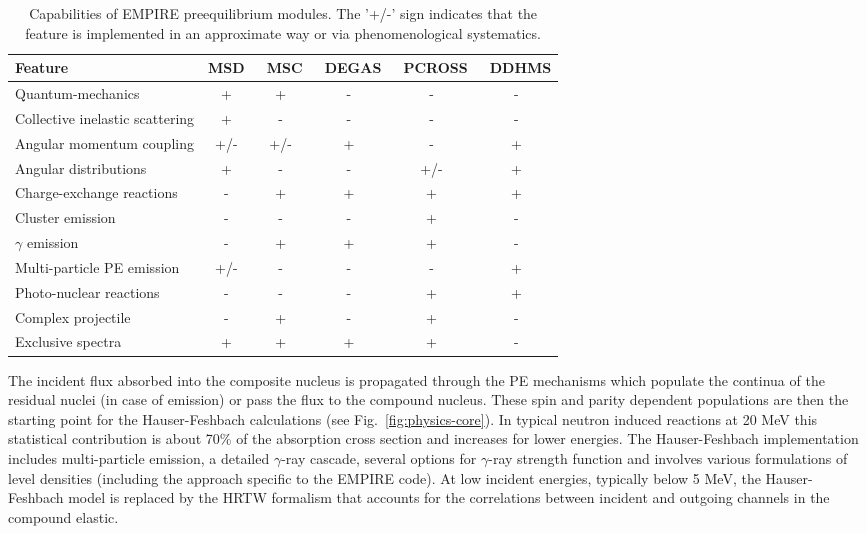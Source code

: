 \begin{table*}[tbp]
\caption{Capabilities of EMPIRE preequilibrium modules. The '+/-' sign
indicates that the feature is implemented in an approximate way or via
phenomenological systematics.}
\label{tbl:PEcapabilities}%
\begin{tabular}{lccccc}
\hline
\textbf{Feature} & \textbf{MSD } & \textbf{\ MSC } & \textbf{\ DEGAS } &
\textbf{\ PCROSS } & \textbf{\ DDHMS } \\ \hline
Quantum-mechanics & + & + & - & - & - \\
Collective inelastic scattering & + & - & - & - & - \\
Angular momentum coupling & +/- & +/- & + & - & + \\
Angular distributions & + & - & - & +/- & + \\
Charge-exchange reactions & - & + & + & + & + \\
Cluster emission & - & - & - & + & - \\
$\gamma$ emission & - & + & + & + & - \\
Multi-particle PE emission & +/- & - & - & - & + \\
Photo-nuclear reactions & - & - & - & + & + \\
Complex projectile & - & + & - & + & - \\
Exclusive spectra & + & + & + & + & - \\ \hline
\end{tabular}%
\end{table*}

The incident flux absorbed into the composite nucleus is propagated through
the PE mechanisms which populate the continua of the residual nuclei (in case of
emission) or pass the flux to the compound nucleus. These spin and
parity dependent populations are then the starting point for the
Hauser-Feshbach calculations (see Fig.~\ref{fig:physics-core}). In typical
neutron induced reactions at 20 MeV this statistical contribution is about
70\% of the absorption cross section and increases for lower energies. The
Hauser-Feshbach implementation includes multi-particle emission, a
detailed $\gamma $-ray cascade, several options for $\gamma $-ray strength
function and involves various formulations of level densities (including the
approach specific to the EMPIRE code). At low incident energies, typically
below 5 MeV, the Hauser-Feshbach model is replaced by the HRTW formalism
that accounts for the correlations between incident and outgoing channels in
the compound elastic.

